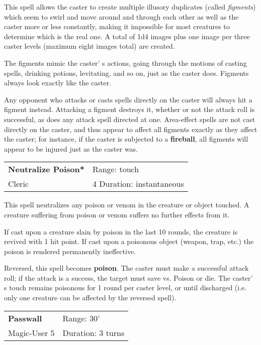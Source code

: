\documentclass[a4paper,twoside,openany,10pt]{book}
\begin{document}
\begin{multicols}{2}
This spell allows the caster to create multiple illusory duplicates (called \emph{figments}) which seem to swirl and move around and through each other as well as the caster more or less constantly, making it impossible for most creatures to determine which is the real one. A total of 1d4 images plus one image per three caster levels (maximum eight images total) are created.

The figments mimic the caster' s actions, going through the motions of casting spells, drinking potions, levitating, and so on, just as the caster does. Figments always look exactly like the caster.

Any opponent who attacks or casts spells directly on the caster will always hit a figment instead. Attacking a figment destroys it, whether or not the attack roll is successful, as does any attack spell directed at one. Area-effect spells are not cast directly on the caster, and thus appear to affect all figments exactly as they affect the caster; for instance, if the caster is subjected to a \textbf{fireball}, all figments will appear to be injured just as the caster was.


\smallskip\begin{flushleft} 
	\begin{tabularx}{0.45\textwidth}{@{}m{3.4cm}m{5.5cm}@{}} 
		\textbf{Neutralize Poison*} & Range: touch\\
Cleric &4 Duration: instantaneous\\
	\end{tabularx}\end{flushleft}

This spell neutralizes any poison or venom in the creature or object touched. A creature suffering from poison or venom suffers no further effects from it.

If cast upon a creature slain by poison in the last 10 rounds, the creature is revived with 1 hit point. If cast upon a poisonous object (weapon, trap, etc.) the poison is rendered permanently ineffective.

Reversed, this spell becomes \textbf{poison}. The caster must make a successful attack roll; if the attack is a success, the target must save vs. Poison or die. The caster' s touch remains poisonous for 1 round per caster level, or until discharged (i.e. only one creature can be affected by the reversed spell).


\smallskip\begin{flushleft} 
	\begin{tabularx}{0.45\textwidth}{@{}m{3.5cm}m{5.5cm}@{}} 
		\textbf{Passwall} & Range: 30'\\
Magic-User 5 &Duration: 3 turns\\
	\end{tabularx}\end{flushleft}


\end{multicols}
\end{document}
